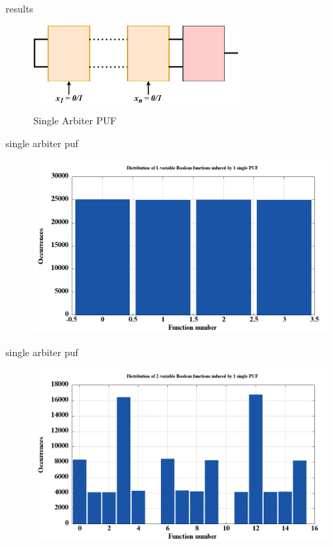 \documentclass[10pt, compress]{beamer}
\begin{document}

\begin{frame}{results}
    \begin{figure}
        \centering
        \includegraphics[width=0.7\textwidth]{figures/puf_1.pdf}
        \caption{Single Arbiter PUF}
    \end{figure}
\end{frame}

\begin{frame}{single arbiter puf}
    \begin{figure}
        \centering
        \includegraphics[width=\textwidth]{figures/dist/distribution_of_1-variable_boolean_functions_induced_by_1_single_puf.png}
    \end{figure}
\end{frame}

\begin{frame}{single arbiter puf}
    \begin{figure}
        \centering
        \includegraphics[width=\textwidth]{figures/dist/distribution_of_2-variable_boolean_functions_induced_by_1_single_puf.png}
    \end{figure}
\end{frame}
\end{document}
